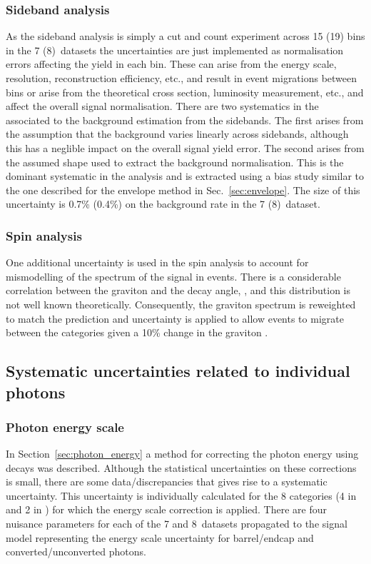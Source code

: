 \subsubsection{Sideband analysis}

As the sideband analysis is simply a cut and count experiment across 15 (19) bins in the 7 (8)~\TeV datasets the uncertainties are just implemented as normalisation errors affecting the yield in each bin. These can arise from the energy scale, resolution, reconstruction efficiency, etc., and result in event migrations between bins or arise from the theoretical cross section, luminosity measurement, etc., and affect the overall signal normalisation. There are two systematics in the \SMVA associated to the background estimation from the sidebands. The first arises from the assumption that the background varies linearly across sidebands, although this has a neglible impact on the overall signal yield error. The second arises from the assumed shape used to extract the background normalisation. This is the dominant systematic in the analysis and is extracted using a bias study similar to the one described for the envelope method in Sec.~\ref{sec:envelope}. The size of this uncertainty is 0.7\% (0.4\%) on the background rate in the 7 (8)~\TeV dataset.

\subsubsection{Spin analysis}

One additional uncertainty is used in the spin analysis to account for mismodelling of the \pT spectrum of the signal in \MC events. There is a considerable correlation between the graviton \pT and the decay angle, \costhetastar, and this distribution is not well known theoretically. Consequently, the graviton \pT spectrum is reweighted to match the \SM prediction and uncertainty is applied to allow events to migrate between the \abscostheta categories given a 10\% change in the graviton \pT.

\subsection{Systematic uncertainties related to individual photons}

\subsubsection{Photon energy scale}
In Section~\ref{sec:photon_energy} a method for correcting the photon energy using \Zee decays was described. Although the statistical uncertainties on these corrections is small, there are some data/\MC discrepancies that gives rise to a systematic uncertainty. This uncertainty is individually calculated for the 8 categories (4 in \eta and 2 in \rnine) for which the energy scale correction is applied. There are four nuisance parameters for each of the 7 and 8~\TeV datasets propagated to the signal model representing the energy scale uncertainty for barrel/endcap and converted/unconverted photons.

